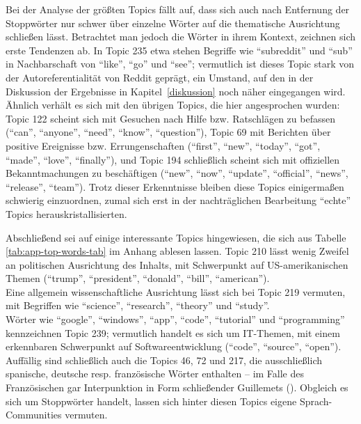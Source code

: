 \documentclass[11pt,a4paper,twoside]{article}
\begin{document}
Bei der Analyse der größten Topics fällt auf, dass sich auch nach
Entfernung der Stoppwörter nur schwer über einzelne Wörter auf die
thematische Ausrichtung schließen lässt. Betrachtet man jedoch die
Wörter in ihrem Kontext, zeichnen sich erste Tendenzen ab. In Topic 235
etwa stehen Begriffe wie \enquote{subreddit} und \enquote{sub} in
Nachbarschaft von \enquote{like}, \enquote{go} und \enquote{see};
vermutlich ist dieses Topic stark von der Autoreferentialität von Reddit
geprägt, ein Umstand, auf den in der Diskussion der Ergebnisse in
Kapitel~\ref{diskussion} noch näher eingegangen wird.\\
Ähnlich verhält es sich mit den übrigen Topics, die hier angesprochen
wurden: Topic 122 scheint sich mit Gesuchen nach Hilfe bzw. Ratschlägen
zu befassen (\enquote{can}, \enquote{anyone}, \enquote{need},
\enquote{know}, \enquote{question}), Topic 69 mit Berichten über
positive Ereignisse bzw. Errungenschaften (\enquote{first},
\enquote{new}, \enquote{today}, \enquote{got}, \enquote{made},
\enquote{love}, \enquote{finally}), und Topic 194 schließlich scheint
sich mit offiziellen Bekanntmachungen zu beschäftigen (\enquote{new},
\enquote{now}, \enquote{update}, \enquote{official}, \enquote{news},
\enquote{release}, \enquote{team}). Trotz dieser Erkenntnisse bleiben
diese Topics einigermaßen schwierig einzuordnen, zumal sich erst in der
nachträglichen Bearbeitung \enquote{echte} Topics
herauskristallisierten.

Abschließend sei auf einige interessante Topics hingewiesen, die sich
aus Tabelle \ref{tab:app-top-words-tab} im Anhang ablesen lassen. Topic
210 lässt wenig Zweifel an politischen Ausrichtung des Inhalts, mit
Schwerpunkt auf US-amerikanischen Themen (\enquote{trump},
\enquote{president}, \enquote{donald}, \enquote{bill},
\enquote{american}).\\
Eine allgemein wissenschaftliche Ausrichtung lässt sich bei Topic 219
vermuten, mit Begriffen wie \enquote{science}, \enquote{research},
\enquote{theory} und \enquote{study}.\\
Wörter wie \enquote{google}, \enquote{windows}, \enquote{app},
\enquote{code}, \enquote{tutorial} und \enquote{programming}
kennzeichnen Topic 239; vermutlich handelt es sich um IT-Themen, mit
einem erkennbaren Schwerpunkt auf Softwareentwicklung (\enquote{code},
\enquote{source}, \enquote{open}).\\
Auffällig sind schließlich auch die Topics 46, 72 und 217, die
ausschließlich spanische, deutsche resp. französische Wörter enthalten
-- im Falle des Französischen gar Interpunktion in Form schließender
Guillemets (\guillemotleft). Obgleich es sich um Stoppwörter handelt,
lassen sich hinter diesen Topics eigene Sprach-Communities vermuten.
\end{document}
